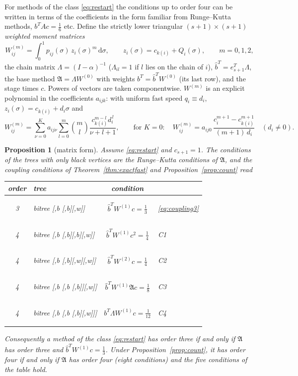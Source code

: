\documentclass[11pt,a4paper]{article}
\newtheorem{proposition}[theorem]{Proposition}
\theoremstyle{definition}
\theoremstyle{remark}
\newcommand{\dd}{\,\mathrm{d}}
\newcommand{\btree}[1]{\begin{forest}bitree #1\end{forest}}
\newcommand{\Tbbw}{\btree{[,b [,b][,w]]}}
\newcommand{\Tfourbbw}{\btree{[,b [,b][,b][,w]]}}
\newcommand{\Tfourbww}{\btree{[,b [,b][,w][,w]]}}
\newcommand{\Tfourbbl}{\btree{[,b [,b [,b]][,w]]}}
\newcommand{\Tfourbbwl}{\btree{[,b [,b [,b][,w]]]}}
\begin{document}
For methods of the class \eqref{eq:restart} the conditions up to order four can be written in terms of the coefficients
in the form familiar from Runge--Kutta methods, $b^TAc=\frac16$ etc. Define the strictly lower triangular
$(s+1)\times(s+1)$ \emph{weighted moment matrices}
\begin{equation}\label{eq:moments}
 W^{(m)}_{ij}=\int_0^1p_{ij}(\sigma)\,z_i(\sigma)^m\dd\sigma,\qquad z_i(\sigma)=c_{k(i)}+Q_i(\sigma),\qquad m=0,1,2,
\end{equation}
the chain matrix $\Lambda=(I-\alpha)^{-1}$ ($\Lambda_{il}=1$ if $l$ lies on the chain of $i$), $\hat b^T=e_{s+1}^T\Lambda$, the
base method $\mathfrak A=\Lambda W^{(0)}$ with weights $b^T=\hat b^TW^{(0)}$ (its last row), and the stage times $c$. Powers
of vectors are taken componentwise. $W^{(m)}$ is an explicit polynomial in the coefficients $a_{ijk}$: with uniform fast
speed $q_i\equiv d_i$, $z_i(\sigma)=c_{k(i)}+d_i\sigma$ and
\[
 W^{(m)}_{ij}=\sum_{\nu=0}^Ka_{ij\nu}\sum_{l=0}^m\binom ml\frac{c_{k(i)}^{m-l}d_i^{\,l}}{\nu+l+1},
 \qquad\text{for }K=0:\quad W^{(m)}_{ij}=a_{ij0}\,\frac{c_i^{m+1}-c_{k(i)}^{m+1}}{(m+1)\,d_i}\quad(d_i\ne0).
\]

\begin{proposition}[matrix form]\label{prop:matrix}
Assume \eqref{eq:restart} and $c_{s+1}=1$. The conditions of the trees with only black vertices are the Runge--Kutta
conditions of $\mathfrak A$, and the coupling conditions of Theorem~\ref{thm:exactfast} and Proposition~\ref{prop:count}
read
\begin{center}
\renewcommand{\arraystretch}{1.5}
\begin{tabular}{clcl}
\toprule
order & tree & condition & \\\midrule
3 & \Tbbw & $\hat b^TW^{(1)}c=\frac13$ & \eqref{eq:coupling3}\\
4 & \Tfourbbw & $\hat b^TW^{(1)}c^2=\frac14$ & C1\\
4 & \Tfourbww & $\hat b^TW^{(2)}c=\frac14$ & C2\\
4 & \Tfourbbl & $\hat b^TW^{(1)}\mathfrak Ac=\frac18$ & C3\\
4 & \Tfourbbwl & $b^T\Lambda W^{(1)}c=\frac1{12}$ & C4\\
\bottomrule
\end{tabular}
\end{center}
Consequently a method of the class \eqref{eq:restart} has order three if and only if $\mathfrak A$ has order three and
$\hat b^TW^{(1)}c=\frac13$. Under Proposition~\ref{prop:count}, it has order four if and only if $\mathfrak A$ has order
four (eight conditions) and the five conditions of the table hold.
\end{proposition}
\end{document}
